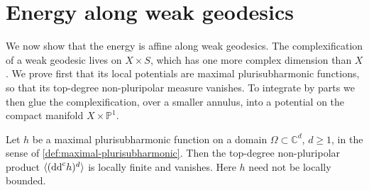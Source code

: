 \section{Energy along weak geodesics}
\label{sec:geodesic-energy-linearity}
We now show that the energy is affine along weak geodesics. The complexification of a weak geodesic lives on $X\times S$, which has one more complex dimension than $X$. We prove first that its local potentials are maximal plurisubharmonic functions, so that its top-degree non-pluripolar measure vanishes. To integrate by parts we then glue the complexification, over a smaller annulus, into a potential on the compact manifold $X\times\mathbb P^1$.

\begin{lemma}\label{lem:unbounded-maximal-nonpluripolar-zero}
Let $h$ be a maximal plurisubharmonic function on a domain $\Omega\subset\mathbb C^d$, $d\geq1$, in the sense of \cref{def:maximal-plurisubharmonic}. Then the top-degree non-pluripolar product $\langle(\mathrm{dd}^{\mathrm{c}} h)^d\rangle$ is locally finite and vanishes. Here $h$ need not be locally bounded.
\end{lemma}
